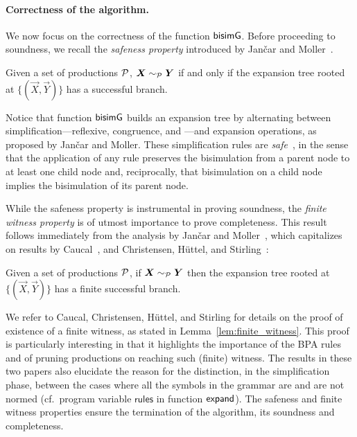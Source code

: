 \paragraph{Correctness of the algorithm.}

We now focus on the correctness of the function $\mathsf{bisimG}$.  Before
proceeding to soundness, we recall the \emph{safeness property}
introduced by Jan{\v{c}}ar and Moller~\cite{janvcar1999techniques}.

\begin{lemma} 
  \label{lem:safeness}
  Given a set of productions $\mathcal P$,
  $\vec X \ProdEquiv \vec Y$ if and only if the expansion tree rooted
  at $\{(\vec X, \vec Y)\}$ has a successful branch.
\end{lemma}

Notice that function $\mathsf{bisimG}$ builds an expansion tree by alternating
between simplification---reflexive, congruence, and \BPA---and
expansion operations, as proposed by Jan{\v{c}}ar and Moller.
%
These simplification rules are
\emph{safe}~\cite{janvcar1999techniques}, in the sense that the
application of any rule preserves the bisimulation from a parent node
to at least one child node and, reciprocally, that bisimulation on a
child node implies the bisimulation of its parent node.

While the safeness property is instrumental in proving
soundness, the \emph{finite witness property} is of
utmost importance to prove completeness. This result follows
immediately from the analysis by Jan{\v{c}}ar and
Moller~\cite{janvcar1999techniques}, which capitalizes on results by
Caucal~\cite{caucal1986decidabilite}, and Christensen, H{\"{u}}ttel, and
Stirling~\cite{DBLP:journals/iandc/ChristensenHS95}:

\begin{lemma} 
\label{lem:finite_witness}
	Given a set of productions $\mathcal P$,
	if $\vec X \ProdEquiv \vec Y$ then the expansion tree rooted at
	$\{(\vec X, \vec Y)\}$ has a finite successful branch.
\end{lemma}

We refer to Caucal, Christensen, H{\"{u}}ttel, and Stirling for
details on the proof of existence of a finite witness, as stated in
Lemma~\ref{lem:finite_witness}. This proof is particularly interesting
in that it highlights the importance of the BPA rules and of pruning
productions on reaching such (finite) witness. The results in these
two papers also elucidate the reason for the distinction, in the
simplification phase, between the cases where all the symbols in the
grammar are and are not normed (cf.~program variable $\mathsf{rules}$
in function $\mathsf{expand}$).
%
The safeness and finite witness properties ensure the termination of
the algorithm, its soundness and completeness.

